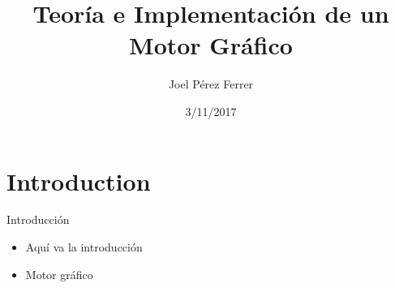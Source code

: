\documentclass{beamer}
\title[T. e I. de un Motor Gráfico]{Teoría e Implementación de un Motor Gráfico}
\author{Joel Pérez Ferrer}
\institute{Institut de Bruguers}
\date{3/11/2017}
\begin{document}
\begin{frame}
  \titlepage
\end{frame}

\section{Introduction}
\begin{frame}{Introducción}
  \begin{itemize}
  \item Aquí va la introducción
  \item Motor gráfico
  \end{itemize}
\end{frame}
\end{document}

